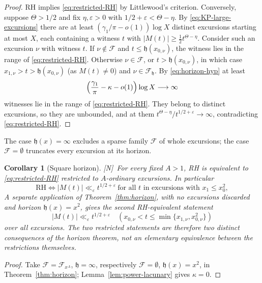 \documentclass[11pt]{amsart}
\numberwithin{equation}{section}
\theoremstyle{plain}
\newtheorem{corollary}[theorem]{Corollary}
\theoremstyle{definition}
\theoremstyle{remark}
\newcommand{\eps}{\varepsilon}
\newcommand{\F}{\mathcal{F}}
\newcommand{\tagN}{\textup{[N]}}
\begin{document}
\begin{proof}
RH implies \eqref{eq:restricted-RH} by Littlewood's criterion. Conversely,
suppose $\Theta>1/2$ and fix $\eta,\eps>0$ with
$1/2+\eps<\Theta-\eta$. By \eqref{eq:KP-large-excursions} there are at least
$(\gamma_1/\pi-o(1))\log X$ distinct excursions starting at most $X$, each
containing a witness $t$ with $|M(t)|\ge\frac12t^{\Theta-\eta}$. Consider
such an excursion $\nu$ with witness $t$. If $\nu\notin\F$ and
$t\le \mathfrak h(x_{0,\nu})$, the witness lies in the range of
\eqref{eq:restricted-RH}. Otherwise $\nu\in\F$, or $t>\mathfrak h(x_{0,\nu})$, in
which case $x_{1,\nu}>t>\mathfrak h(x_{0,\nu})$ (as $M(t)\ne0$) and $\nu\in\F_{\mathfrak h}$. By
\eqref{eq:horizon-hyp} at least
\[
\Bigl(\frac{\gamma_1}{\pi}-\kappa-o(1)\Bigr)\log X\longrightarrow\infty
\]
witnesses lie in the range of \eqref{eq:restricted-RH}. They belong to
distinct excursions, so they are unbounded, and at them
$t^{\Theta-\eta}/t^{1/2+\eps}\to\infty$, contradicting
\eqref{eq:restricted-RH}.
\end{proof}

The case $\mathfrak h(x)=\infty$ excludes a sparse family $\F$ of whole excursions;
the case $\F=\emptyset$ truncates every excursion at its horizon.

\begin{corollary}[Square horizon]
\label{cor:power-ordinary-RH}
\tagN\ For every fixed $A>1$, RH is equivalent to \eqref{eq:restricted-RH}
restricted to $A$-ordinary excursions. In particular
\begin{equation}
\label{eq:square-horizon-RH}
\boxed{\ \mathrm{RH}\iff
|M(t)|\ll_\eps t^{1/2+\eps}
\ \text{for all $t$ in excursions with }x_1\le x_0^2,\ }
\end{equation}
A separate application of Theorem~\ref{thm:horizon}, with no excursions
discarded and horizon $\mathfrak h(x)=x^2$, gives the second RH-equivalent
statement
\[
 |M(t)|\ll_\eps t^{1/2+\eps}
 \quad(x_{0,\nu}<t\le\min\{x_{1,\nu},x_{0,\nu}^2\})
\]
over all excursions.  The two restricted statements are therefore two
distinct consequences of the horizon theorem, not an elementary equivalence
between the restrictions themselves.
\end{corollary}

\begin{proof}
Take $\F=\F_{x^A}$, $\mathfrak h=\infty$, respectively $\F=\emptyset$, $\mathfrak h(x)=x^2$, in
Theorem~\ref{thm:horizon}; Lemma~\ref{lem:power-lacunary} gives
$\kappa=0$.
\end{proof}
\end{document}
